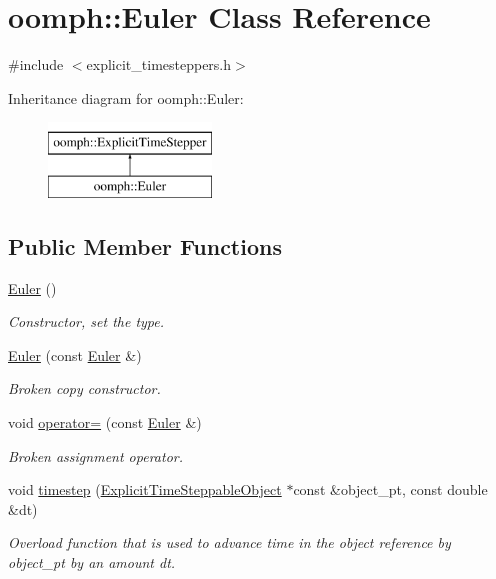 \hypertarget{classoomph_1_1Euler}{}\section{oomph\+:\+:Euler Class Reference}
\label{classoomph_1_1Euler}


{\ttfamily \#include $<$explicit\+\_\+timesteppers.\+h$>$}

Inheritance diagram for oomph\+:\+:Euler\+:\begin{figure}[H]
\begin{center}
\leavevmode
\includegraphics[height=2.000000cm]{classoomph_1_1Euler}
\end{center}
\end{figure}
\subsection*{Public Member Functions}
\begin{DoxyCompactItemize}
\item 
\hyperlink{classoomph_1_1Euler_a6d7ce4a89e4464afee180b7e7a69bc30}{Euler} ()
\begin{DoxyCompactList}\small\item\em Constructor, set the type. \end{DoxyCompactList}\item 
\hyperlink{classoomph_1_1Euler_a45d5fafc7d7cc41750205c4a7690e093}{Euler} (const \hyperlink{classoomph_1_1Euler}{Euler} \&)
\begin{DoxyCompactList}\small\item\em Broken copy constructor. \end{DoxyCompactList}\item 
void \hyperlink{classoomph_1_1Euler_a4065f553b267a18392b3d052f5779d31}{operator=} (const \hyperlink{classoomph_1_1Euler}{Euler} \&)
\begin{DoxyCompactList}\small\item\em Broken assignment operator. \end{DoxyCompactList}\item 
void \hyperlink{classoomph_1_1Euler_adeea8e3567a50fb3873fab05a7ca928a}{timestep} (\hyperlink{classoomph_1_1ExplicitTimeSteppableObject}{Explicit\+Time\+Steppable\+Object} $\ast$const \&object\+\_\+pt, const double \&dt)
\begin{DoxyCompactList}\small\item\em Overload function that is used to advance time in the object reference by object\+\_\+pt by an amount dt. \end{DoxyCompactList}\end{DoxyCompactItemize}
